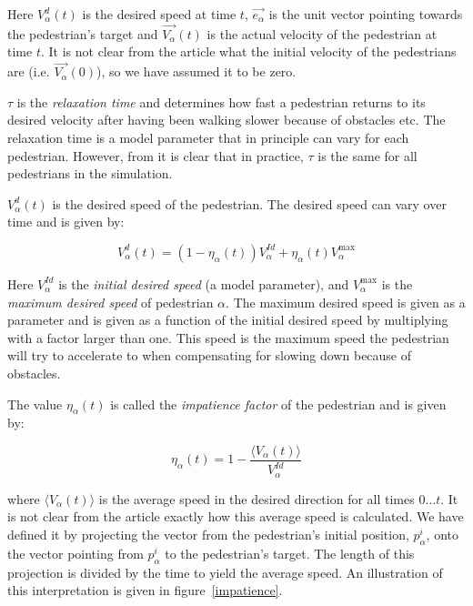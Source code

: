Here $V_{\alpha}^{d}(t)$ is the desired speed at time $t$, 
$\overrightarrow{e_{\alpha}}$ is the unit vector pointing towards the 
pedestrian's target and  $\overrightarrow{V_{\alpha}}(t)$ is the actual 
velocity of the pedestrian at time $t$. It is not clear from the article what 
the initial velocity of the pedestrians are (i.e.  
$\overrightarrow{V_\alpha}(0)$), so we have assumed it to be zero.


$\tau$ is the \emph{relaxation time} and determines how fast a pedestrian 
returns to its desired velocity after having been walking slower because of 
obstacles etc. The relaxation time is a model parameter that in principle can vary 
for each pedestrian. However, from \cite{self-org} it is clear that in 
practice, $\tau$ is the same for all pedestrians in the simulation.

$V_{\alpha}^{d}(t)$ is the desired speed of the pedestrian. The desired speed 
can vary over time and is given by:

\begin{equation}\label{eqn:desired-speed}
    V_{\alpha}^{d}(t) = \left( 1 - \eta_{\alpha}(t) \right) 
    V_{\alpha}^{Id} +
    \eta_{\alpha}(t) V_{\alpha}^{\text{max}}
\end{equation}

Here $V_{\alpha}^{Id}$ is the \emph{initial desired speed} (a model 
parameter), and $V_{\alpha}^{\text{max}}$ is the \emph{maximum desired speed} 
of pedestrian $\alpha$. The maximum desired speed is given as a parameter and 
is given as a function of the initial desired speed by multiplying with a 
factor larger than one. This speed is the maximum speed the pedestrian will 
try to accelerate to when compensating for slowing down because of obstacles.

The value $\eta_{\alpha}(t)$ is called the \emph{impatience factor} of the 
pedestrian and is given by:

\begin{equation}\label{eqn:impatience}
	\eta_{\alpha}(t) =
    1 - \frac{\langle V_{\alpha}(t)\rangle}{V^{Id}_{\alpha}}
\end{equation}

where $\langle V_{\alpha}(t) \rangle$ is the average speed in the desired 
direction for all times $0\dots t$. It is not clear from the article exactly 
how this average speed is calculated. We have defined it by projecting the 
vector from the pedestrian's initial position, $p^i_\alpha$, onto the vector 
pointing from $p^i_\alpha$ to the pedestrian's target. The length of this 
projection is divided by the time to yield the average speed. An 
illustration of this interpretation is given in figure~\ref{impatience}.

